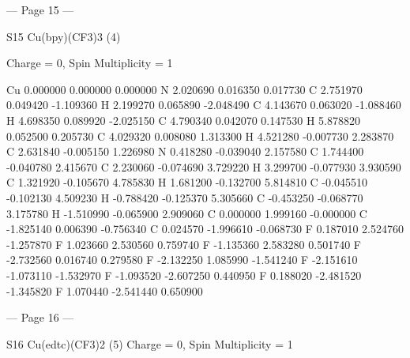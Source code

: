  
 
 
 
 
 
 
 


--- Page 15 ---
 
S15 
Cu(bpy)(CF3)3 (4) 
 
Charge = 0, Spin Multiplicity = 1 
 
  Cu      0.000000      0.000000      0.000000 
  N       2.020690      0.016350      0.017730 
  C       2.751970      0.049420     -1.109360 
  H       2.199270      0.065890     -2.048490 
  C       4.143670      0.063020     -1.088460 
  H       4.698350      0.089920     -2.025150 
  C       4.790340      0.042070      0.147530 
  H       5.878820      0.052500      0.205730 
  C       4.029320      0.008080      1.313300 
  H       4.521280     -0.007730      2.283870 
  C       2.631840     -0.005150      1.226980 
  N       0.418280     -0.039040      2.157580 
  C       1.744400     -0.040780      2.415670 
  C       2.230060     -0.074690      3.729220 
  H       3.299700     -0.077930      3.930590 
  C       1.321920     -0.105670      4.785830 
  H       1.681200     -0.132700      5.814810 
  C      -0.045510     -0.102130      4.509230 
  H      -0.788420     -0.125370      5.305660 
  C      -0.453250     -0.068770      3.175780 
  H      -1.510990     -0.065900      2.909060 
  C       0.000000      1.999160     -0.000000 
  C      -1.825140      0.006390     -0.756340 
  C       0.024570     -1.996610     -0.068730 
  F       0.187010      2.524760     -1.257870 
  F       1.023660      2.530560      0.759740 
  F      -1.135360      2.583280      0.501740 
  F      -2.732560      0.016740      0.279580 
  F      -2.132250      1.085990     -1.541240 
  F      -2.151610     -1.073110     -1.532970 
  F      -1.093520     -2.607250      0.440950 
  F       0.188020     -2.481520     -1.345820 
  F       1.070440     -2.541440      0.650900 
 
 
 
 
 
 


--- Page 16 ---
 
S16 
Cu(edtc)(CF3)2 (5) 
Charge = 0, Spin Multiplicity = 1 
 
